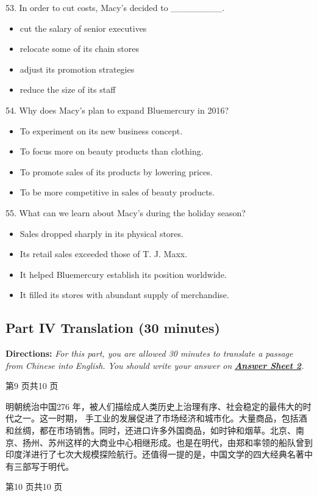 \documentclass[UTF8,11pt]{ctexart}
\begin{document}
53. In order to cut costs, Macy's decided to \_\_\_\_\_\_\_\_.


\begin{itemize}[leftmargin=2em,itemsep=.2em,topsep=.4em]\item[A.] cut the salary of senior executives
\item[B.] relocate some of its chain stores
\item[C.] adjust its promotion strategies
\item[D.] reduce the size of its staff
\end{itemize}

54. Why does Macy's plan to expand Bluemercury in 2016?


\begin{itemize}[leftmargin=2em,itemsep=.2em,topsep=.4em]\item[A.] To experiment on its new business concept.
\item[B.] To focus more on beauty products than clothing.
\item[C.] To promote sales of its products by lowering prices.
\item[D.] To be more competitive in sales of beauty products.
\end{itemize}

55. What can we learn about Macy's during the holiday season?


\begin{itemize}[leftmargin=2em,itemsep=.2em,topsep=.4em]\item[A.] Sales dropped sharply in its physical stores.
\item[B.] Its retail sales exceeded those of T. J. Maxx.
\item[C.] It helped Bluemercury establish its position worldwide.
\item[D.] It filled its stores with abundant supply of merchandise.
\end{itemize}

\subsection*{\textbf{Part IV} \textbf{Translation} \textbf{(30 minutes)}}


\textbf{Directions:}\textit{ For this part, you are allowed 30 minutes to translate a passage from Chinese into} \textit{English. You should write your answer on}\textbf{\textit{ }}\textbf{\textit{\uline{Answer Sheet 2}}}\textit{.}


第9 页共10 页


明朝统治中国276 年，被人们描绘成人类历史上治理有序、社会稳定的最伟大的时代之一。这一时期， 手工业的发展促进了市场经济和城市化。大量商品，包括酒和丝绸，都在市场销售。同时，还进口许多外国商品，如时钟和烟草。北京、南京、扬州、苏州这样的大商业中心相继形成。也是在明代，由郑和率领的船队曾到印度洋进行了七次大规模探险航行。还值得一提的是，中国文学的四大经典名著中有三部写于明代。


第10 页共10 页
\end{document}
